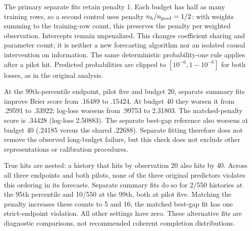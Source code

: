 The primary separate fits retain penalty 1. Each budget has half as many training rows, so a second control uses penalty $n_h/n_{\rm pool}=1/2$: with weights summing to the training-row count, this preserves the penalty per weighted observation. Intercepts remain unpenalized. This changes coefficient sharing and parameter count; it is neither a new forecasting algorithm nor an isolated causal intervention on information. The same deterministic probability-one rule applies after a pilot hit. Predicted probabilities are clipped to $[10^{-6},1-10^{-6}]$ for both losses, as in the original analysis.

\begin{table}[htbp]\centering\small
\caption{Exploratory forecast-specification check. Brier scores use all campaigns and equal source/table weighting. Shared: original coefficients across budgets. Separate: independent budget fits, penalty 1. Matched: separate fits with penalty $1/2$. All endpoints, pilots and budgets are shown; these are repeated forecasts of the same 550 histories.}
\label{tab:horizon_specification}

\end{table}

At the 99th-percentile endpoint, pilot five and budget 20, separate summary fits improve Brier score from .16489 to .15424. At budget 40 they worsen it from .29591 to .33922; log-loss worsens from .99753 to 2.31803. The matched-penalty score is .34428 (log-loss 2.50883). The separate best-gap reference also worsens at budget 40 (.24185 versus the shared .22688). Separate fitting therefore does not remove the observed long-budget failure, but this check does not exclude other representations or calibration procedures.

True hits are nested: a history that hits by observation 20 also hits by 40. Across all three endpoints and both pilots, none of the three original predictors violates this ordering in its forecasts. Separate summary fits do so for 2/550 histories at the 95th percentile and 10/550 at the 99th, both at pilot five. Matching the penalty increases these counts to 5 and 16; the matched best-gap fit has one strict-endpoint violation. All other settings have zero. These alternative fits are diagnostic comparisons, not recommended coherent completion distributions.

